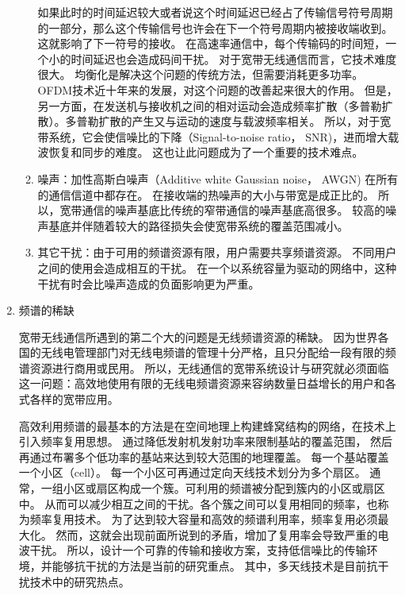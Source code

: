 \begin{enumerate}[1)]
\begin{enumerate}[(1)]
如果此时的时间延迟较大或者说这个时间延迟已经占了传输信号符号周期的一部分，那么这个传输信号也许会在下一个符号周期内被接收端收到。
这就影响了下一符号的接收。
在高速率通信中，每个传输码的时间短，一个小的时间延迟也会造成码间干扰。
对于宽带无线通信而言，它技术难度很大。
均衡化是解决这个问题的传统方法，但需要消耗更多功率。
OFDM技术近十年来的发展，对这个问题的改善起来很大的作用。
但是，另一方面，在发送机与接收机之间的相对运动会造成频率扩散（多普勒扩散）。多普勒扩散的产生又与运动的速度与载波频率相关。
所以，对于宽带系统，它会使信噪比的下降（Signal-to-noise ratio， SNR)，进而增大载波恢复和同步的难度。
这也让此问题成为了一个重要的技术难点。
\item 噪声：加性高斯白噪声（Additive white Gaussian noise， AWGN) 在所有的通信信道中都存在。
在接收端的热噪声的大小与带宽是成正比的。
所以，宽带通信的噪声基底比传统的窄带通信的噪声基底高很多。
较高的噪声基底并伴随着较大的路径损失会使宽带系统的覆盖范围减小。
\item 其它干扰：由于可用的频谱资源有限，用户需要共享频谱资源。
不同用户之间的使用会造成相互的干扰。
在一个以系统容量为驱动的网络中，这种干扰有时会比噪声造成的负面影响更为严重。
\end{enumerate}
\item{频谱的稀缺}

宽带无线通信所遇到的第二个大的问题是无线频谱资源的稀缺。
因为世界各国的无线电管理部门对无线电频谱的管理十分严格，且只分配给一段有限的频谱资源进行商用或民用。
所以，无线通信的宽带系统设计与研究就必须面临这一问题：高效地使用有限的无线电频谱资源来容纳数量日益增长的用户和各式各样的宽带应用。
\par 高效利用频谱的最基本的方法是在空间地理上构建蜂窝结构的网络，在技术上引入频率复用思想。
通过降低发射机发射功率来限制基站的覆盖范围，
然后再通过布署多个低功率的基站来达到较大范围的地理覆盖。
每一个基站覆盖一个小区（cell）。
每一个小区可再通过定向天线技术划分为多个扇区。
通常，一组小区或扇区构成一个簇。可利用的频谱被分配到簇内的小区或扇区中。
从而可以减少相互之间的干扰。各个簇之间可以复用相同的频率，也称为频率复用技术。
为了达到较大容量和高效的频谱利用率，频率复用必须最大化。
然而，这就会出现前面所说到的矛盾，增加了复用率会导致严重的电波干扰。
所以，设计一个可靠的传输和接收方案，支持低信噪比的传输环境，并能够抗干扰的方法是当前的研究重点。
其中，多天线技术是目前抗干扰技术中的研究热点。


\end{enumerate}
